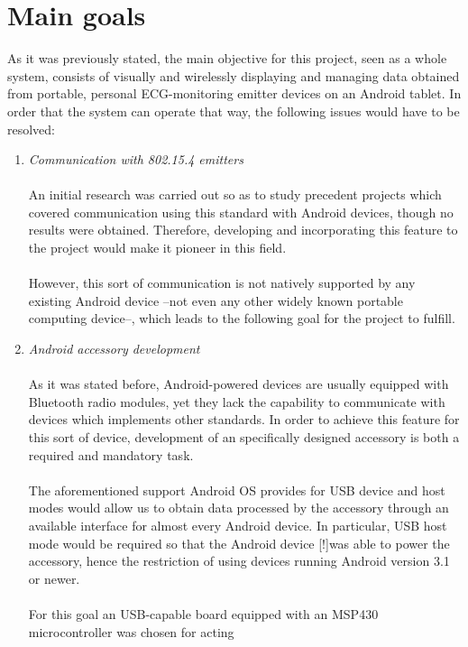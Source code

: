 	\section{Main goals}
		As it was previously stated, the main objective for this project, seen as a whole system, consists of
		visually and wirelessly displaying and managing data obtained from portable, personal ECG-monitoring
		emitter devices on an Android tablet. In order that the system can operate that way, the following 
		issues would have to be resolved:
		\begin{enumerate}
			\item \emph{Communication with 802.15.4 emitters}\\\\
				An initial research was carried out so as to study precedent projects which covered communication
				using this standard with Android devices, though no results were obtained. Therefore, developing
				and	incorporating this feature to the project would make it pioneer in this field.\\\\
				However, this sort of communication is not natively supported by any existing Android device
				--not even any other widely known portable computing device--, which leads to the following goal
				for the project to fulfill.\\
			\item \emph{Android accessory development}\\\\
				As it was stated before, Android-powered devices are usually equipped with Bluetooth radio
				modules, yet they lack the capability to communicate with devices which implements other 
				standards. In order to achieve this feature for this sort of device, development of an
				specifically designed accessory is both a required and mandatory task.\\\\
				The aforementioned support Android OS provides for USB device and host modes would allow us to
				obtain data processed by the accessory through an available interface for almost every 
				Android device. In particular, USB host mode would be required so that the Android device 
				[!]was able to power the accessory, hence the restriction of using devices running %
				Android version 3.1 or newer.\\\\
				For this goal an USB-capable board equipped with an MSP430 microcontroller was chosen for acting

\end{enumerate}

